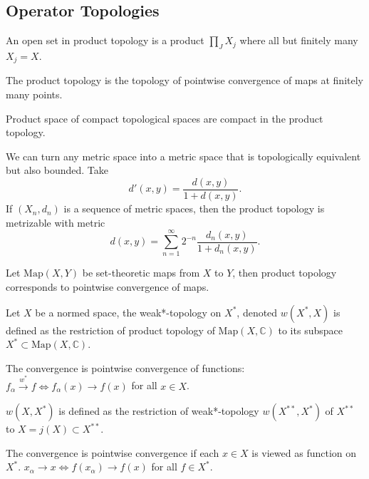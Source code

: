 

\subsection{Operator Topologies}




\begin{remark}
	An open set in product topology is a product $\prod_J X_j$ where all but finitely many $X_j = X$.

	The product topology is the topology of pointwise convergence of maps at finitely many points.
\end{remark}

\begin{theorem}[Tikhonov]
	\label{thm:Tikhonov}
	Product space of compact topological spaces are compact in the product topology.
\end{theorem}

\begin{remark}
	We can turn any metric space into a metric space that is topologically equivalent but also bounded. Take
	\[
		d'(x, y) = \frac{d(x, y)}{ 1 + d(x,y)}
	.\] 
	If $(X_n , d_n)$ is a sequence of metric spaces, then the product topology is metrizable with metric
	\[
		d(x, y) = \sum_{n=1}^{\infty} 2^{- n} \frac{d_n(x, y)}{1 + d_n(x, y)}
	.\] 
\end{remark}

Let $\text{Map}(X, Y)$ be set-theoretic maps from $X$ to $Y$, then product topology corresponds to pointwise convergence of maps.

\begin{definition}
	\label{defn:WeakStarTopology}
	Let $X$ be a normed space, the weak*-topology on $X^*$, denoted $w(X^*, X)$ is defined as the restriction of product topology of $\text{Map}(X, \mathbb{C})$ to its subspace $X^* \subset \text{Map}(X, \mathbb{C})$.

	The convergence is pointwise convergence of functions: $f_\alpha \xrightarrow{w^*} f \iff  f_\alpha(x) \to f(x)$ for all $x \in X$.
\end{definition}

\begin{definition}
	\label{defn:WeakTopology}
	$w(X, X^*)$ is defined as the restriction of weak*-topology  $w(X^{**}, X^*)$ of $X^{* *}$ to $X = j(X) \subset X^{* *}$.

	The convergence is pointwise convergence if each $x \in X$ is viewed as function on $X^*$. $x_\alpha \to x \iff  f(x_\alpha) \to f(x) $ for all $f \in X^*$.
\end{definition}

